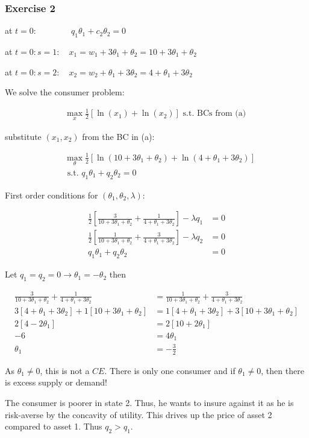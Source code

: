 {\subsubsection*{Exercise 2}

\begin{enumerate}[label=(\alph*)]
{\item
at $t=0: \quad\quad\quad\quad q_1 \theta_1+c_2 \theta_2=0$ 

at $t=0: s=1: \quad x_1=w_1+3 \theta_1+\theta_2=10+3 \theta_1+\theta_2$

at $t=0: s=2: \quad x_2=w_2+ \theta_1+3\theta_2=4+\theta_1+3\theta_2$
}
{\item
We solve the consumer problem:

\begin{align*}
    \max _x \frac{1}{2}\left[\ln \left(x_1\right)+\ln \left(x_2\right)\right] \text { s.t. BCs from (a) }
\end{align*}

substitute $(x_1, x_2)$ from the BC in (a):

\begin{align*}
    &\max _\theta \frac{1}{2}\left[\ln \left(10+3 \theta_1+\theta_2\right)+\ln \left(4+\theta_1+3 \theta_2\right)\right] \\
    &\text { s.t. } q_1 \theta_1+q_2 \theta_2=0
\end{align*}

First order conditions for $(\theta_1, \theta_2, \lambda)$:

\begin{align*}
    \frac{1}{2}\left[\frac{3}{10+3 \theta_1+\theta_2}+\frac{1}{4+\theta_1+3 \theta_2}\right]-\lambda q_1 &= 0 \\
    \frac{1}{2}\left[\frac{1}{10+3 \theta_1+\theta_2}+\frac{3}{4+\theta_1+3 \theta_2}\right]-\lambda q_2 &= 0 \\
    q_1 \theta_1+q_2 \theta_2 &= 0
\end{align*}

Let $q_1=q_2=0 \rightarrow \theta_1=-\theta_2$ then

\begin{align*}
    \frac{3}{10+3 \theta_1+\theta_2}+\frac{1}{4+\theta_1+3 \theta_2} &= \frac{1}{10+3 \theta_1+\theta_2}+\frac{3}{4+\theta_1+3 \theta_2} \\
    3 \left[4+\theta_1+3 \theta_2\right] + 1 \left[10+3 \theta_1+\theta_2\right] &= 1 \left[ 4+\theta_1+3 \theta_2 \right] + 3 \left[ 10+3 \theta_1+\theta_2 \right] \\
    2\left[4-2 \theta_1\right] & =2\left[10+2 \theta_1\right] \\ -6 & =4 \theta_1 \\ \theta_1 & =-\frac{3}{2}
\end{align*}

As $\theta_1 \neq 0$, this is not a $C E$. There is only one consumer and if $\theta_1 \neq 0$, then there is excess supply or demand!
}
{\item
The consumer is poorer in state 2. Thus, he wants to insure against it as he is risk-averse by the concavity of utility. This drives up the price of asset 2 compared to asset 1. Thus $q_2>q_1$.
}
\end{enumerate}
}